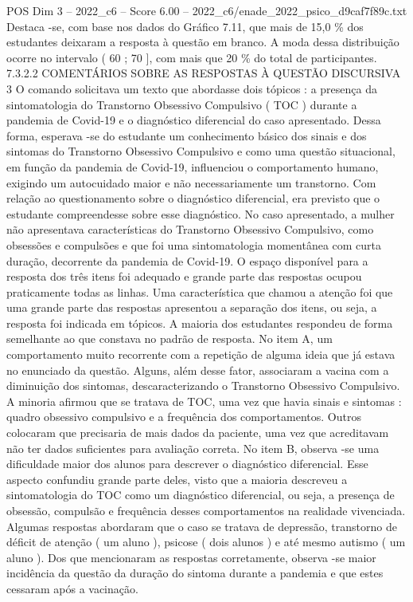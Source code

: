 \begin{textsample}{POS Dim 3 – 2022\_c6 – Score 6.00 – 2022\_c6/enade\_2022\_psico\_d9caf7f89c.txt}
Destaca -se, com base nos dados do Gráfico 7.11, que mais de 15,0 \% dos estudantes deixaram a resposta à questão em branco.
A moda dessa distribuição ocorre no intervalo ( 60 ; 70 ], com mais que 20 \% do total de participantes. 7.3.2.2 COMENTÁRIOS SOBRE AS RESPOSTAS À QUESTÃO DISCURSIVA 3 O comando solicitava um texto que abordasse dois tópicos : a presença da sintomatologia do Transtorno Obsessivo Compulsivo ( TOC ) durante a pandemia de Covid-19 e o diagnóstico diferencial do caso apresentado.
Dessa forma, esperava -se do estudante um conhecimento básico dos sinais e dos sintomas do Transtorno Obsessivo Compulsivo e como uma questão situacional, em função da pandemia de Covid-19, influenciou o comportamento humano, exigindo um autocuidado maior e não necessariamente um transtorno.
Com relação ao questionamento sobre o diagnóstico diferencial, era previsto que o estudante compreendesse sobre esse diagnóstico.
No caso apresentado, a mulher não apresentava características do Transtorno Obsessivo Compulsivo, como obsessões e compulsões e que foi uma sintomatologia momentânea com curta duração, decorrente da pandemia de Covid-19.
O espaço disponível para a resposta dos três itens foi adequado e grande parte das respostas ocupou praticamente todas as linhas.
Uma característica que chamou a atenção foi que uma grande parte das respostas apresentou a separação dos itens, ou seja, a resposta foi indicada em tópicos.
A maioria dos estudantes respondeu de forma semelhante ao que constava no padrão de resposta.
No item A, um comportamento muito recorrente com a repetição de alguma ideia que já estava no enunciado da questão.
Alguns, além desse fator, associaram a vacina com a diminuição dos sintomas, descaracterizando o Transtorno Obsessivo Compulsivo.
A minoria afirmou que se tratava de TOC, uma vez que havia sinais e sintomas : quadro obsessivo compulsivo e a frequência dos comportamentos.
Outros colocaram que precisaria de mais dados da paciente, uma vez que acreditavam não ter dados suficientes para avaliação correta.
No item B, observa -se uma dificuldade maior dos alunos para descrever o diagnóstico diferencial.
Esse aspecto confundiu grande parte deles, visto que a maioria descreveu a sintomatologia do TOC como um diagnóstico diferencial, ou seja, a presença de obsessão, compulsão e frequência desses comportamentos na realidade vivenciada.
Algumas respostas abordaram que o caso se tratava de depressão, transtorno de déficit de atenção ( um aluno ), psicose ( dois alunos ) e até mesmo autismo ( um aluno ).
Dos que mencionaram as respostas corretamente, observa -se maior incidência da questão da duração do sintoma durante a pandemia e que estes cessaram após a vacinação.

\end{textsample}
